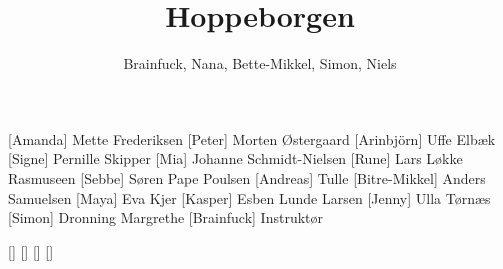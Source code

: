 \documentclass[a4paper,11pt]{article}
\title{Hoppeborgen}
\author{Brainfuck, Nana, Bette-Mikkel, Simon, Niels}
\begin{document}
\maketitle

\begin{roles}
[Amanda] Mette Frederiksen
[Peter] Morten Østergaard
[Arinbjörn] Uffe Elbæk
[Signe] Pernille Skipper
[Mia] Johanne Schmidt-Nielsen
[Rune] Lars Løkke Rasmuseen
[Sebbe] Søren Pape Poulsen
[Andreas] Tulle
[Bitre-Mikkel] Anders Samuelsen
[Maya] Eva Kjer
[Kasper] Esben Lunde Larsen
[Jenny] Ulla Tørnæs
[Simon] Dronning Margrethe
[Brainfuck] Instruktør
\end{roles}

\begin{props}
[]
[]
[]
[]
\end{props}
\end{document}

